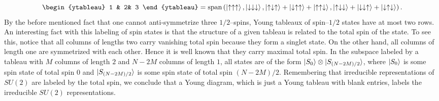 \begin{equation}
\begin{ytableau}
1 & 2& 3 
\end{ytableau}=\Span{\ket{\uparrow \uparrow \uparrow },\ket{\downarrow\downarrow\downarrow},\ket{\uparrow\downarrow\uparrow}+\ket{\downarrow\uparrow\uparrow}+\ket{\uparrow\uparrow\downarrow},\ket{\uparrow\downarrow\downarrow}+\ket{\downarrow\downarrow\uparrow}+\ket{\downarrow\uparrow\downarrow}}.
\end{equation}
By the before mentioned fact that one cannot anti-symmetrize three $ 1/2 $--spins, Young tableaux of spin--$1/2$ states have at most two rows. An interesting fact with this labeling of spin states is that the structure of a given tableau is related to the total spin of the state. To see this, notice that all columns of lengths two carry vanishing total spin because they form a singlet state. On the other hand, all columns of length one are symmetrized with each other. Hence it is well known that they carry maximal total spin. In the subspace labeled by a tableau with $ M $ columns of length $ 2 $ and $ N-2M $ columns of length $ 1 $, all states are of the form $ \ket{S_0}\otimes \ket{S_{(N-2M)/2}} $, where $ \ket{S_0} $ is some spin state of total spin $ 0 $ and $ \ket{S_{(N-2M)/2}} $ is some spin state of total spin $ (N-2M)/2 $. Remembering that irreducible representations of $ SU(2) $ are labeled by the total spin, we conclude that a Young diagram, which is just a Young tableau with blank entries, labels the irreducible $ SU(2) $ representations.\\
